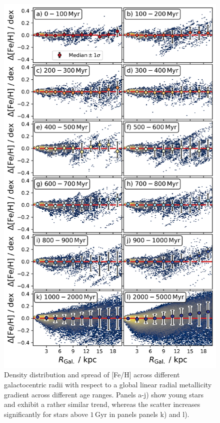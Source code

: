 \documentclass[fleqn,usenatbib]{mnras}
\begin{document}
\begin{figure}
    \centering
    \includegraphics[width=\columnwidth]{figures/scatter_with_increasing_age.png}
    \caption{Density distribution and spread of [Fe/H] across different galactocentric radii with respect to a global linear radial metallicity gradient across different age ranges. Panels a-j) show young stars and exhibit a rather similar trend, whereas the scatter increases significantly for stars above $1\,\mathrm{Gyr}$ in panels panels k) and l).}
    \label{fig:scatter_with_increasing_age}
\end{figure}
\end{document}
